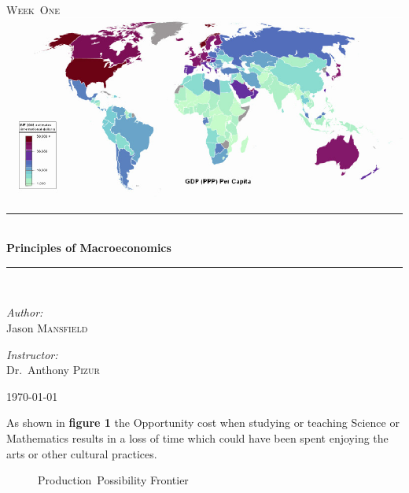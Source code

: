 \documentclass[pdftex,12pt,a4paper]{report}
\newcommand{\HRule}{\rule{\linewidth}{0.5mm}}
\begin{document}
%
\begin{titlepage}
\begin{center}


\textsc{\color{Sepia}{\LARGE EC~320}}\\[1.5cm]
\textsc{\Large Week~One}\\[0.5cm]
\includegraphics[scale=0.5]{GDP}\\
\cite{wiki:001}
\HRule \\[0.4cm]
{ \huge \bfseries Principles of Macroeconomics}\\[0.4cm]
\HRule \\[1.5cm]


\begin{minipage}{0.4\textwidth}
\begin{flushleft} \large
\emph{Author:}\\
Jason \textsc{Mansfield}
\end{flushleft}
\end{minipage}
\begin{minipage}{0.4\textwidth}
\begin{flushright} \large
\emph{Instructor:} \\
Dr.~Anthony \textsc{Pizur}
\end{flushright}
\end{minipage}

\vfill

{\large \today}


\end{center}
\end{titlepage}
As shown in \textbf{figure 1} the Opportunity cost when studying or teaching Science or Mathematics results in a loss of time which could have been spent enjoying the arts or other cultural practices. 
\begin{figure}[Production–possibility frontier]
\caption{Production~Possibility Frontier}
\end{figure}
\clearpage
    \nocite{*}
    
    
\end{document}
